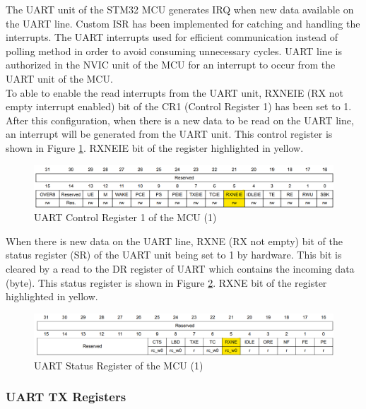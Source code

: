 The UART unit of the STM32 MCU generates IRQ when new data available on the UART line. Custom ISR has been implemented for catching and handling the interrupts. The UART interrupts used for efficient communication instead of polling method in order to avoid consuming unnecessary cycles. UART line is authorized in the NVIC unit of the MCU for an interrupt to occur from the UART unit of the MCU. \\

To able to enable the read interrupts from the UART unit, RXNEIE (RX not empty interrupt enabled) bit of the CR1 (Control Register 1) has been set to 1. After this configuration, when there is a new data to be read on the UART line, an interrupt will be generated from the UART unit. This control register is shown in Figure \ref{fig:uart_cr_register}. RXNEIE bit of the register highlighted in yellow.

\begin{figure}[!htbp]
    \centering
    \includegraphics[width=1\textwidth]{Imgs/cr_register.png}
    \caption{\label{fig:uart_cr_register}UART Control Register 1 of the MCU (1) \cite{Ref_stm32_um}}
\end{figure}

When there is new data on the UART line, RXNE (RX not empty) bit of the status register (SR) of the UART unit being set to 1 by hardware. This bit is cleared by a read to the DR register of UART which contains the incoming data (byte). This status register is shown in Figure \ref{fig:uart_sr_register}. RXNE bit of the register highlighted in yellow.

\begin{figure}[!htbp]
    \centering
    \includegraphics[width=1\textwidth]{Imgs/sr_register.png}
    \caption{\label{fig:uart_sr_register}UART Status Register of the MCU (1) \cite{Ref_stm32_um}}
\end{figure}


\subsubsection{UART TX Registers}
\label{sec_transmit_rc_info}


